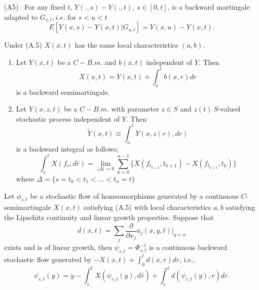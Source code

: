 (A5)~ For any fixed $t$, $Y(., s)-Y(., t)$, $s \in[0,t]$, is a
backward martingale adapted to $G_{s,t},i.e$. for $s< u < t$ 
$$
E[Y(x,s)-Y(x,t)|G_{u,t}]=Y(x,u)-Y(x,t).
$$

\begin{remark}\label{c2:rem2.6.1}%
  Under (A.5) $X(x,t)$ has the same local characteristics $(a,b)$.
\end{remark}

\setcounter{example}{1}
\begin{example}\label{c2:exam2.6.2}%
  \begin{enumerate}[(1)]
  \item Let $Y(x,t)$ be a $C-B.m$. and $b(x,t)$ independent of $Y$. Then
    $$
    X(x,t)=Y(x,t)+\int^t_o b(x,r)dr
    $$
    is a backward semimartingale.

  \item Let $Y(x,z,t)$ be a $C-B.m$. with parameter $z \in S$
    and $z(t)~S$-valued stochastic process independent of $Y$. Then  
    $$
    \tilde{Y}(x,t)\equiv \int^t_o Y(x,z(r),dr)
    $$
    is a backward integral as follows;
    \begin{equation*}
      \int^t_s X(f_r,d \hat{r}) = \lim\limits_{|\Delta|\to
        0} \sum\limits^{n-1}_{k=0} \{X(f_{t_{k+1}}, t_{k+1}) -
      X(f_{t_{k+1}}, t_k)\}\tag{2.6.3}\label{c2:eq2.6.3} 
    \end{equation*}
    where $\Delta=\{s=t_0 < t_1 < \ldots < t_n =t\}$
  \end{enumerate}
\end{example}


\setcounter{theorem}{2}
\begin{theorem}\label{c2:thm2.6.3}%
  Let $\phi_{s,t}$ be a stochastic flow of homeomorphisms generated by
  a continuous $C$-semimartingale $X(x,t)$ satisfying (A.5) with local
  characteristics $a,b$ satisfying the Lipschitz continuity and linear
  growth properties. Suppose that 
  $$
  d(x, t) = \sum_j \frac{\partial}{\partial x_j} a_j (x, y, t)|_{y=x}
  $$\pageoriginale
  exists and is of linear growth, then $\psi_{s, t} = \Phi_{s,t}^{-1}$
  is a continuous backward stochastic flow generated by $-X (x, t) +
  \int ^t_0 d(x, r) dr$, i.e.,  
  \begin{equation*}
    \psi_{s,t}(y) = y - \int_s^t X (\psi_{r,t}(y), d\hat{r}) + \int^t_s
    d(\psi_{r,t}(y),r)dr. \tag{2.6.4}\label{c2:eq2.6.4} 
  \end{equation*}
\end{theorem}


